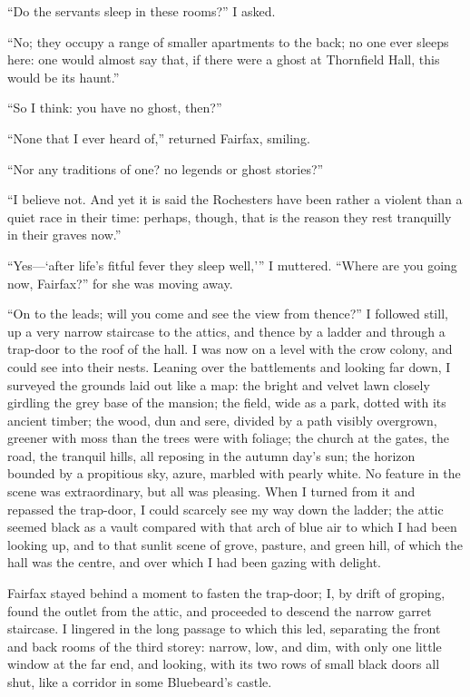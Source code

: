 \enquote{Do the servants sleep in these rooms?} I asked.

\enquote{No; they occupy a range of smaller apartments to the back; no
	one ever sleeps here: one would almost say that, if there were a ghost
	at Thornfield Hall, this would be its haunt.}

\enquote{So I think: you have no ghost, then?}

\enquote{None that I ever heard of,} returned \Mrs{} Fairfax, smiling.

\enquote{Nor any traditions of one? no legends or ghost stories?}

\enquote{I believe not. And yet it is said the Rochesters have been
	rather a violent than a quiet race in their time: perhaps, though, that
	is the reason they rest tranquilly in their graves now.}

\enquote{Yes---\enquote{after life's fitful fever they sleep well,}} I
muttered. \enquote{Where are you going now, \Mrs{} Fairfax?} for she was
moving away.

\enquote{On to the leads; will you come and see the view from thence?}
I followed still, up a very narrow staircase to the attics, and thence
by a ladder and through a trap-door to the roof of the hall. I was now
on a level with the crow colony, and could see into their nests.
Leaning over the battlements and looking far down, I surveyed the
grounds laid out like a map: the bright and velvet lawn closely girdling
the grey base of the mansion; the field, wide as a park, dotted with its
ancient timber; the wood, dun and sere, divided by a path visibly
overgrown, greener with moss than the trees were with foliage; the
church at the gates, the road, the tranquil hills, all reposing in the
autumn day's sun; the horizon bounded by a propitious sky, azure,
marbled with pearly white. No feature in the scene was extraordinary,
but all was pleasing. When I turned from it and repassed the trap-door,
I could scarcely see my way down the ladder; the attic seemed black as a
vault compared with that arch of blue air to which I had been looking
up, and to that sunlit scene of grove, pasture, and green hill, of which
the hall was the centre, and over which I had been gazing with delight.

\Mrs{} Fairfax stayed behind a moment to fasten the trap-door; I, by drift
of groping, found the outlet from the attic, and proceeded to descend
the narrow garret staircase. I lingered in the long passage to which
this led, separating the front and back rooms of the third storey:
narrow, low, and dim, with only one little window at the far end, and
looking, with its two rows of small black doors all shut, like a
corridor in some Bluebeard's castle.

